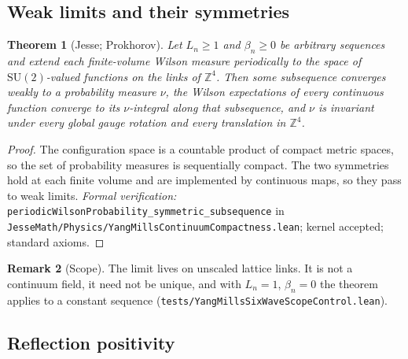 \documentclass[11pt]{article}
\numberwithin{equation}{subsection}
\theoremstyle{plain}
\newtheorem{theorem}{Theorem}[subsection]
\theoremstyle{definition}
\newtheorem{remark}[theorem]{Remark}
\newcommand{\Z}{\mathbb{Z}}
\newcommand{\SU}{\mathrm{SU}}
\begin{document}
\subsection{Weak limits and their symmetries}

\begin{theorem}[Jesse; Prokhorov]\label{thm:compact}
Let $L_n\ge 1$ and $\beta_n\ge 0$ be arbitrary sequences and extend each finite-volume Wilson
measure periodically to the space of $\SU(2)$-valued functions on the links of $\Z^4$. Then
some subsequence converges weakly to a probability measure $\nu$, the Wilson expectations of
every continuous function converge to its $\nu$-integral along that subsequence, and $\nu$ is
invariant under every global gauge rotation and every translation in $\Z^4$.
\end{theorem}
\begin{proof}
The configuration space is a countable product of compact metric spaces, so the set of
probability measures is sequentially compact. The two symmetries hold at each finite volume and
are implemented by continuous maps, so they pass to weak limits. \emph{Formal verification:}
\texttt{periodic\allowbreak{}Wilson\allowbreak{}Probability\_\allowbreak{}symmetric\_\allowbreak{}subsequence} in
\texttt{Jesse\allowbreak{}Math/\allowbreak{}Physics/\allowbreak{}Yang\allowbreak{}Mills\allowbreak{}Continuum\allowbreak{}Compactness.\allowbreak{}lean}; kernel accepted; standard axioms.
\end{proof}

\begin{remark}[Scope]
The limit lives on unscaled lattice links. It is not a continuum field, it need not be unique,
and with $L_n=1$, $\beta_n=0$ the theorem applies to a constant sequence
(\texttt{tests/\allowbreak{}Yang\allowbreak{}Mills\allowbreak{}Six\allowbreak{}Wave\allowbreak{}Scope\allowbreak{}Control.\allowbreak{}lean}).
\end{remark}

\subsection{Reflection positivity}
\end{document}

